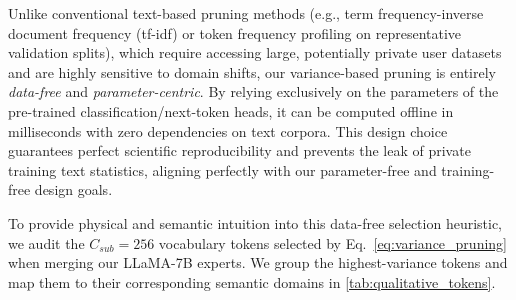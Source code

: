 Unlike conventional text-based pruning methods (e.g., term frequency-inverse document frequency (tf-idf) or token frequency profiling on representative validation splits), which require accessing large, potentially private user datasets and are highly sensitive to domain shifts, our variance-based pruning is entirely \emph{data-free} and \emph{parameter-centric}. By relying exclusively on the parameters of the pre-trained classification/next-token heads, it can be computed offline in milliseconds with zero dependencies on text corpora. This design choice guarantees perfect scientific reproducibility and prevents the leak of private training text statistics, aligning perfectly with our parameter-free and training-free design goals.

To provide physical and semantic intuition into this data-free selection heuristic, we audit the $C_{sub} = 256$ vocabulary tokens selected by Eq.~\ref{eq:variance_pruning} when merging our LLaMA-7B experts. We group the highest-variance tokens and map them to their corresponding semantic domains in \cref{tab:qualitative_tokens}.

